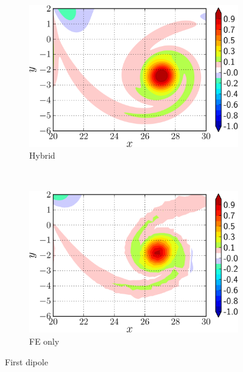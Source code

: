 	\begin{figure}[!p]
     \centering
     \begin{subfigure}[t]{0.49\textwidth}
             \includegraphics[width=\textwidth]{./figures/hybrid/isc/hybrid_isc_firstDipole_hybrid_compressed-crop.png}
             \caption{Hybrid}
             \label{fig:hybrid_isc_firstDipole_hybrid_compressed-crop}
     \end{subfigure}%
     ~ %
     \begin{subfigure}[t]{0.49\textwidth}
             \includegraphics[width=\textwidth]{./figures/hybrid/isc/hybrid_isc_firstDipole_FE_compressed-crop.png}
             \caption{FE only}
             \label{fig:hybrid_isc_firstDipole_FE_compressed-crop}
     \end{subfigure}
     \caption{First dipole}
     \label{fig:hybrid_isc_firstDipole}
	\end{figure}

